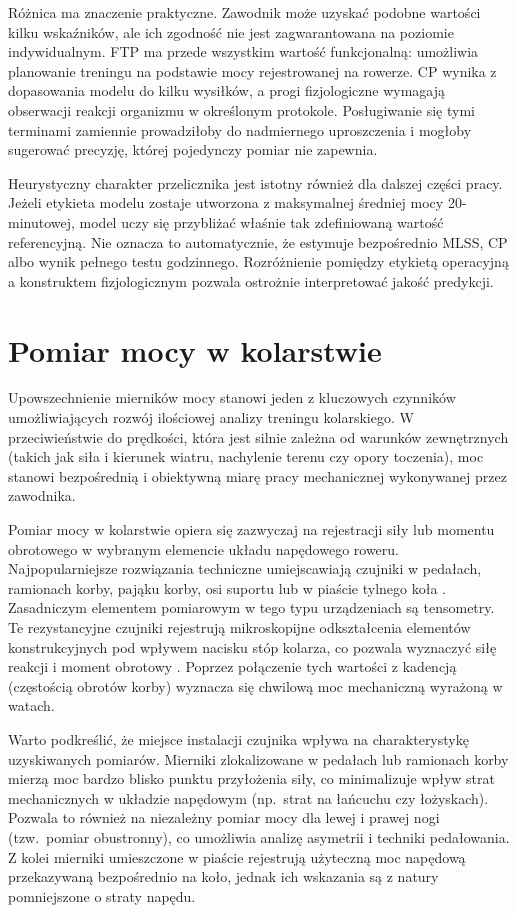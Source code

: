 Różnica ma znaczenie praktyczne. Zawodnik może uzyskać podobne wartości kilku wskaźników, ale ich zgodność nie jest zagwarantowana na poziomie indywidualnym. FTP ma przede wszystkim wartość funkcjonalną: umożliwia planowanie treningu na podstawie mocy rejestrowanej na rowerze. CP wynika z dopasowania modelu do kilku wysiłków, a progi fizjologiczne wymagają obserwacji reakcji organizmu w określonym protokole. Posługiwanie się tymi terminami zamiennie prowadziłoby do nadmiernego uproszczenia i mogłoby sugerować precyzję, której pojedynczy pomiar nie zapewnia.

Heurystyczny charakter przelicznika jest istotny również dla dalszej części pracy. Jeżeli etykieta modelu zostaje utworzona z maksymalnej średniej mocy 20-minutowej, model uczy się przybliżać właśnie tak zdefiniowaną wartość referencyjną. Nie oznacza to automatycznie, że estymuje bezpośrednio $\mathrm{MLSS}$, $\mathrm{CP}$ albo wynik pełnego testu godzinnego. Rozróżnienie pomiędzy etykietą operacyjną a konstruktem fizjologicznym pozwala ostrożnie interpretować jakość predykcji.

\section{Pomiar mocy w kolarstwie}

Upowszechnienie mierników mocy stanowi jeden z kluczowych czynników umożliwiających rozwój ilościowej analizy treningu kolarskiego. W przeciwieństwie do prędkości, która jest silnie zależna od warunków zewnętrznych (takich jak siła i kierunek wiatru, nachylenie terenu czy opory toczenia), moc stanowi bezpośrednią i obiektywną miarę pracy mechanicznej wykonywanej przez zawodnika.

Pomiar mocy w kolarstwie opiera się zazwyczaj na rejestracji siły lub momentu obrotowego w wybranym elemencie układu napędowego roweru. Najpopularniejsze rozwiązania techniczne umiejscawiają czujniki w pedałach, ramionach korby, pająku korby, osi suportu lub w piaście tylnego koła \parencite{luder2024cyclowatt}. Zasadniczym elementem pomiarowym w tego typu urządzeniach są tensometry. Te rezystancyjne czujniki rejestrują mikroskopijne odkształcenia elementów konstrukcyjnych pod wpływem nacisku stóp kolarza, co pozwala wyznaczyć siłę reakcji i moment obrotowy \parencite{bouillod2022powerMeters}. Poprzez połączenie tych wartości z kadencją (częstością obrotów korby) wyznacza się chwilową moc mechaniczną wyrażoną w watach.

Warto podkreślić, że miejsce instalacji czujnika wpływa na charakterystykę uzyskiwanych pomiarów. Mierniki zlokalizowane w pedałach lub ramionach korby mierzą moc bardzo blisko punktu przyłożenia siły, co minimalizuje wpływ strat mechanicznych w układzie napędowym (np.\ strat na łańcuchu czy łożyskach). Pozwala to również na niezależny pomiar mocy dla lewej i prawej nogi (tzw.\ pomiar obustronny), co umożliwia analizę asymetrii i techniki pedałowania. Z kolei mierniki umieszczone w piaście rejestrują użyteczną moc napędową przekazywaną bezpośrednio na koło, jednak ich wskazania są z natury pomniejszone o straty napędu.

